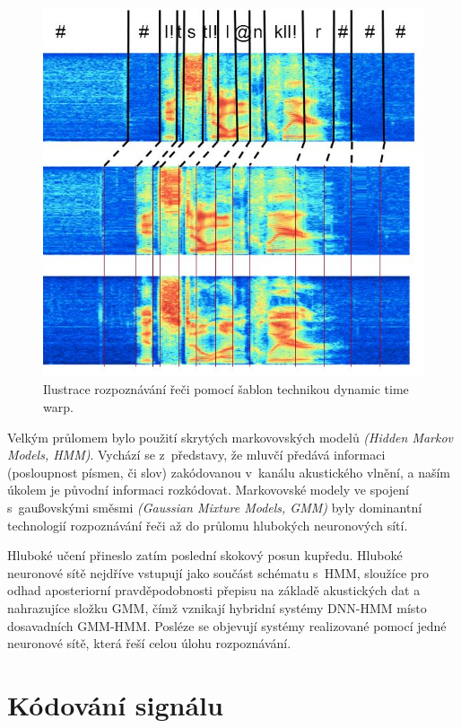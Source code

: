 \begin{figure}[htpb]
\includegraphics[scale=1]{rc/dtw.png}
\caption{
  Ilustrace rozpoznávání řeči pomocí šablon technikou dynamic time warp.
}
\label{fig:dtw}
\end{figure}

Velkým průlomem bylo použití skrytých markovovských modelů \textit{(Hidden
Markov Models, HMM)}. Vychází se z~představy, že mluvčí předává informaci
(posloupnost písmen, či slov) zakódovanou v~kanálu akustického vlnění, a naším
úkolem je původní informaci rozkódovat. Markovovské modely ve spojení
s~gaußovskými směsmi \textit{(Gaussian Mixture Models, GMM)} byly dominantní
technologií rozpoznávání řeči až do průlomu hlubokých neuronových sítí.

Hluboké učení přineslo zatím poslední skokový posun kupředu. Hluboké neuronové
sítě nejdříve vstupují jako součást schématu s~HMM, sloužíce pro odhad
aposteriorní pravděpodobnosti přepisu na základě akustických dat a nahrazujíce
složku GMM, čímž vznikají hybridní systémy DNN-HMM místo dosavadních GMM-HMM.
Posléze se objevují systémy realizované pomocí jedné neuronové sítě, která řeší
celou úlohu rozpoznávání.

\section{Kódování signálu}

